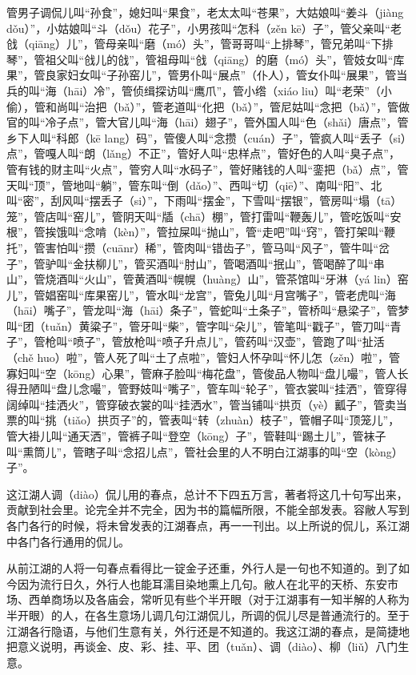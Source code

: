 \documentclass[12pt,UTF8]{ctexbook}
\begin{document}
管男子调侃儿叫“孙食”，媳妇叫“果食”，老太太叫“苍果”，大姑娘叫“姜斗（jiàng dǒu）”，小姑娘叫“斗（dǒu）花子”，小男孩叫“怎科（zěn kē）子”，管父亲叫“老戗（qiāng）儿”，管母亲叫“磨（mó）头”，管哥哥叫“上排琴”，管兄弟叫“下排琴”，管祖父叫“戗儿的戗”，管祖母叫“戗（qiāng）的磨（mó）头”，管妓女叫“库果”，管良家妇女叫“子孙窑儿”，管男仆叫“展点”（仆人），管女仆叫“展果”，管当兵的叫“海（hāi）冷”，管侦缉探访叫“鹰爪”，管小绺（xiáo liu）叫“老荣”（小偷），管和尚叫“治把（bǎ）”，管老道叫“化把（bǎ）”，管尼姑叫“念把（bǎ）”，管做官的叫“冷子点”，管大官儿叫“海（hāi）翅子”，管外国人叫“色（shǎi）唐点”，管乡下人叫“科郎（kē lang）码”，管傻人叫“念攒（cuán）子”，管疯人叫“丢子（si）点”，管嘎人叫“朗（lǎng）不正”，管好人叫“忠样点”，管好色的人叫“臭子点”，管有钱的财主叫“火点”，管穷人叫“水码子”，管好赌钱的人叫“銮把（bǎ）点”，管天叫“顶”，管地叫“躺”，管东叫“倒（dǎo）”、西叫“切（qiē）”、南叫“阳”、北叫“密”，刮风叫“摆丢子（si）”，下雨叫“摆金”，下雪叫“摆银”，管房叫“塌（tā）笼”，管店叫“窑儿”，管阴天叫“牐（chā）棚”，管打雷叫“鞭轰儿”，管吃饭叫“安根”，管挨饿叫“念啃（kèn）”，管拉屎叫“抛山”，管“走吧”叫“窍”，管打架叫“鞭托”，管害怕叫“攒（cuānr）稀”，管肉叫“错齿子”，管马叫“风子”，管牛叫“岔子”，管驴叫“金扶柳儿”，管买酒叫“肘山”，管喝酒叫“抿山”，管喝醉了叫“串山”，管烧酒叫“火山”，管黄酒叫“幌幌（huàng）山”，管茶馆叫“牙淋（yá lin）窑儿”，管娼窑叫“库果窑儿”，管水叫“龙宫”，管兔儿叫“月宫嘴子”，管老虎叫“海（hāi）嘴子”，管龙叫“海（hāi）条子”，管蛇叫“土条子”，管桥叫“悬梁子”，管梦叫“团（tuǎn）黄粱子”，管牙叫“柴”，管字叫“朵儿”，管笔叫“戳子”，管刀叫“青子”，管枪叫“喷子”，管放枪叫“喷子升点儿”，管药叫“汉壶”，管跑了叫“扯活（chě huo）啦”，管人死了叫“土了点啦”，管妇人怀孕叫“怀儿怎（zěn）啦”，管寡妇叫“空（kōng）心果”，管麻子脸叫“梅花盘”，管俊品人物叫“盘儿嘬”，管人长得丑陋叫“盘儿念嘬”，管野妓叫“嘴子”，管车叫“轮子”，管衣裳叫“挂洒”，管穿得阔绰叫“挂洒火”，管穿破衣裳的叫“挂洒水”，管当铺叫“拱页（yè）瓤子”，管卖当票的叫“挑（tiǎo）拱页子”的，管表叫“转（zhuàn）枝子”，管帽子叫“顶笼儿”，管大褂儿叫“通天洒”，管裤子叫“登空（kōng）子”，管鞋叫“踢土儿”，管袜子叫“熏筒儿”，管瞎子叫“念招儿点”，管社会里的人不明白江湖事的叫“空（kòng）子”。

这江湖人调（diào）侃儿用的春点，总计不下四五万言，著者将这几十句写出来，贡献到社会里。论完全并不完全，因为书的篇幅所限，不能全部发表。容敝人写到各门各行的时候，将未曾发表的江湖春点，再一一刊出。以上所说的侃儿，系江湖中各门各行通用的侃儿。

从前江湖的人将一句春点看得比一锭金子还重，外行人是一句也不知道的。到了如今因为流行日久，外行人也能耳濡目染地熏上几句。敝人在北平的天桥、东安市场、西单商场以及各庙会，常听见有些个半开眼（对于江湖事有一知半解的人称为半开眼）的人，在各生意场儿调几句江湖侃儿，所调的侃儿尽是普通流行的。至于江湖各行隐语，与他们生意有关，外行还是不知道的。我这江湖的春点，是简捷地把意义说明，再谈金、皮、彩、挂、平、团（tuǎn）、调（diào）、柳（liǔ）八门生意。
\end{document}
